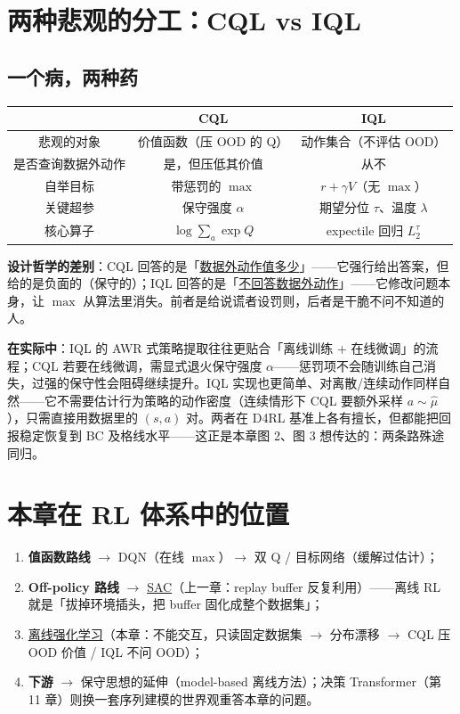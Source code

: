 \documentclass{article}
\begin{document}
\section*{两种悲观的分工：CQL vs IQL}

\subsection*{一个病，两种药}

\begin{center}
\begin{tabular}{c|c|c}
 & \textbf{CQL} & \textbf{IQL} \\
\hline
悲观的对象 & 价值函数（压 OOD 的 Q） & 动作集合（不评估 OOD） \\
是否查询数据外动作 & 是，但压低其价值 & 从不 \\
自举目标 & 带惩罚的 $\max$ & $r + \gamma V$（无 $\max$） \\
关键超参 & 保守强度 $\alpha$ & 期望分位 $\tau$、温度 $\lambda$ \\
核心算子 & $\log\sum_a\exp Q$ & expectile 回归 $L_2^\tau$ \\
\end{tabular}
\end{center}

\textbf{设计哲学的差别}：CQL 回答的是「\underline{数据外动作值多少}」——它强行给出答案，但给的是负面的（保守的）；IQL 回答的是「\underline{不回答数据外动作}」——它修改问题本身，让 $\max$ 从算法里消失。前者是给说谎者设罚则，后者是干脆不问不知道的人。

\textbf{在实际中}：IQL 的 AWR 式策略提取往往更贴合「离线训练 + 在线微调」的流程；CQL 若要在线微调，需显式退火保守强度 $\alpha$——惩罚项不会随训练自己消失，过强的保守性会阻碍继续提升。IQL 实现也更简单、对离散/连续动作同样自然——它不需要估计行为策略的动作密度（连续情形下 CQL 要额外采样 $a\sim\hat\mu$），只需直接用数据里的 $(s,a)$ 对。两者在 D4RL 基准上各有擅长，但都能把回报稳定恢复到 BC 及格线水平——这正是本章图 2、图 3 想传达的：两条路殊途同归。

\section*{本章在 RL 体系中的位置}

\begin{enumerate}
  \item \textbf{值函数路线} $\to$ DQN（在线 $\max$）$\to$ 双 Q / 目标网络（缓解过估计）；
  \item \textbf{Off-policy 路线} $\to$ \underline{SAC}（上一章：replay buffer 反复利用）——离线 RL 就是「拔掉环境插头，把 buffer 固化成整个数据集」；
  \item \underline{离线强化学习}（本章：不能交互，只读固定数据集 $\to$ 分布漂移 $\to$ CQL 压 OOD 价值 / IQL 不问 OOD）；
  \item \textbf{下游} $\to$ 保守思想的延伸（model-based 离线方法）；决策 Transformer（第 11 章）则换一套序列建模的世界观重答本章的问题。
\end{enumerate}
\end{document}
